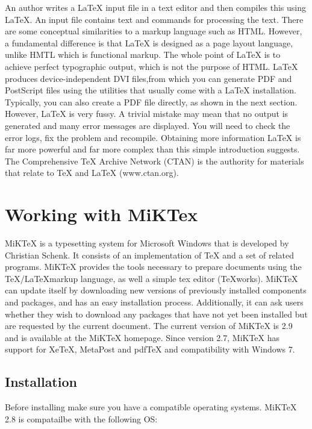 An author writes a {\LaTeX} input file in a text editor and then compiles this using {\LaTeX}. An input file contains text and commands for processing the text. There are some conceptual similarities to a markup language such as HTML. However, a fundamental difference is that {\LaTeX} is designed as a page layout language, unlike HMTL which is functional markup. The whole point of {\LaTeX} is to achieve perfect typographic output, which is not the purpose of HTML. {\LaTeX} produces device-independent DVI files,from which you can generate PDF and PostScript files using the utilities that usually come with a {\LaTeX} installation. Typically, you can also create a PDF file directly, as shown in the next section. However, {\LaTeX} is very fussy. A trivial mistake may mean that no output is generated and many error messages are displayed. You will need to check the error logs, fix the problem and recompile. Obtaining more information {\LaTeX} is far more powerful and far more complex than this simple introduction suggests. The Comprehensive TeX Archive Network (CTAN) is the authority for materials that relate to TeX and {\LaTeX} (www.ctan.org).

\section{Working with MiKTex}

MiKTeX is a typesetting system for Microsoft Windows that is developed by Christian Schenk. It consists of an implementation of {\TeX} and a set of related programs. MiKTeX provides the tools necessary to prepare documents using the \TeX/\LaTeX markup language, as well a simple tex editor (TeXworks). MiKTeX can update itself by downloading new versions of previously installed components and packages, and has an easy installation process. Additionally, it can ask users whether they wish to download any packages that have not yet been installed but are requested by the current document. The current version of MiKTeX is 2.9 and is available at the MiKTeX homepage. Since version 2.7, MiKTeX has support for XeTeX, MetaPost and pdfTeX and compatibility with Windows 7.

\subsection{Installation}

Before installing make sure you have a compatible operating systems. MiKTeX 2.8 is compatailbe with the following OS: 


